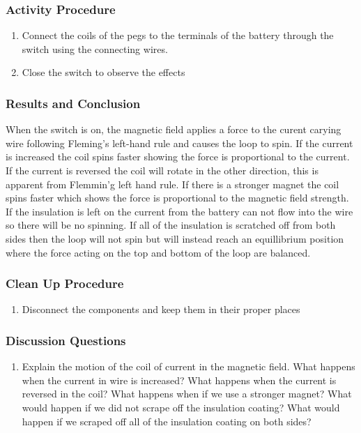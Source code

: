 \subsubsection*{Activity Procedure}
\begin{enumerate}
\item{Connect the coils of the pegs to the terminals of the battery through the switch using the connecting wires.} 
\item{Close the switch to observe the effects}
\end{enumerate}

\subsubsection*{Results and Conclusion}
When the switch is on, the magnetic field applies a force to the curent carying wire following Fleming's left-hand rule and causes the loop to spin. If the current is increased the coil spins faster showing the force is proportional to the current. If the current is reversed the coil will rotate in the other direction, this is apparent from Flemmin'g left hand rule. If there is a stronger magnet the coil spins faster which shows the force is proportional to the magnetic field strength. If the insulation is left on the current from the battery can not flow into the wire so there will be no spinning. If all of the insulation is scratched off from both sides then the loop will not spin but will instead reach an equillibrium position where the force acting on the top and bottom of the loop are balanced.  

\subsubsection*{Clean Up Procedure}
\begin{enumerate}
\item{Disconnect the components and keep them in their proper places}
\end{enumerate}

\subsubsection*{Discussion Questions}
\begin{enumerate}
\item{Explain the motion of the coil of current in the magnetic field. What happens when the current in wire is increased? What happens when the current is reversed in the coil? What happens when if we use a stronger magnet? What would happen if we did not scrape off the insulation coating? What would happen if we scraped off all of the insulation coating on both sides?}
\end{enumerate}

